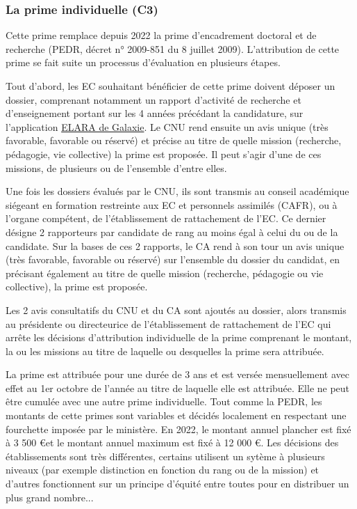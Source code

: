 \subsubsection{La prime individuelle (C3)}
\label{ripec-C3}

Cette prime remplace depuis 2022 la prime d'encadrement doctoral et de recherche (PEDR, d\'ecret n° 2009-851 du 8 juillet 2009). L'attribution de cette prime se fait suite un processus d'\'evaluation en plusieurs \'etapes.

Tout d'abord, les EC souhaitant b\'en\'eficier de cette prime doivent d\'eposer un dossier, comprenant notamment un rapport d'activit\'e de recherche et d'enseignement portant sur les 4 ann\'ees pr\'ec\'edant la candidature, sur l'application \href{https://www.galaxie.enseignementsup-recherche.gouv.fr/ensup/cand_RIPEC.htm}{ELARA de Galaxie}. Le CNU rend ensuite un avis unique (tr\`es favorable, favorable ou r\'eserv\'e) et pr\'ecise au titre de quelle mission (recherche, p\'edagogie, vie collective) la prime est propos\'ee. Il peut s'agir d'une de ces missions, de plusieurs ou de l'ensemble d'entre elles.

Une fois les dossiers \'evalu\'es par le CNU, ils sont transmis au conseil acad\'emique si\'egeant en formation restreinte aux EC et personnels assimil\'es (CAFR), ou \`a l'organe comp\'etent, de l'\'etablissement de rattachement de l'EC. Ce dernier d\'esigne 2 rapporteurs par candidat\mp e de rang au moins \'egal \`a celui du ou de la candidat\mp e. Sur la bases de ces 2 rapports, le CA rend \`a son tour un avis unique (tr\`es favorable, favorable ou r\'eserv\'e) sur l’ensemble du dossier du candidat, en pr\'ecisant \'egalement au titre de quelle mission (recherche, p\'edagogie ou vie collective), la prime est propos\'ee.  

Les 2 avis consultatifs du CNU et du CA sont ajout\'es au dossier, alors transmis au pr\'esident\mp e ou directeur\mp ice de l'\'etablissement de rattachement de l'EC qui arr\^ete les d\'ecisions d’attribution individuelle de la prime comprenant le montant, la ou les missions au titre de laquelle ou desquelles la prime sera attribu\'ee.  

La prime est attribu\'ee pour une dur\'ee de 3 ans et est vers\'ee mensuellement avec effet au 1er octobre de l'ann\'ee au titre de laquelle elle est attribu\'ee. Elle ne peut être cumul\'ee avec une autre prime individuelle. Tout comme la PEDR, les montants de cette primes sont variables et d\'ecid\'es localement en respectant une fourchette impos\'ee par le minist\`ere. En 2022, le montant annuel plancher est fix\'e \`a 3 500 \euro et le montant annuel maximum est fix\'e \`a 12 000 \euro. Les d\'ecisions des \'etablissements sont tr\`es diff\'erentes, certains utilisent un syt\`eme \`a plusieurs niveaux (par exemple distinction en fonction du rang ou de la mission) et d'autres fonctionnent sur un principe d'\'equit\'e entre tou\mp te\mp s pour en distribuer un plus grand nombre...

